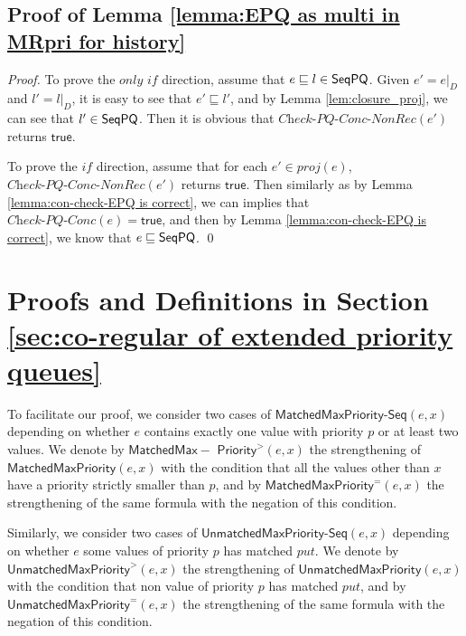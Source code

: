 \subsection{Proof of Lemma \ref{lemma:EPQ as multi in MRpri for history}}

\EPQasMultiInMRpriforHistory*

\begin {proof}

To prove the $\textit{only if}$ direction, assume that $e \sqsubseteq l \in \mathsf{SeqPQ}$. Given $e' = e \vert_{D}$ and $l' = l \vert_{D}$, it is easy to see that $e' \sqsubseteq l'$, and by Lemma \ref{lem:closure_proj}, we can see that $l' \in \mathsf{SeqPQ}$. Then it is obvious that $\textit{Check-PQ-Conc-NonRec}(e')$ returns $\mathsf{true}$.

To prove the $\textit{if}$ direction, assume that for each $e' \in \textit{proj}(e)$, $\textit{Check-PQ-Conc-NonRec}(e')$ returns $\mathsf{true}$. Then similarly as by Lemma \ref{lemma:con-check-EPQ is correct}, we can implies that $\textit{Check-PQ-Conc}(e)=\mathsf{true}$, and then by Lemma \ref{lemma:con-check-EPQ is correct}, we know that $e \sqsubseteq \mathsf{SeqPQ}$. \qed
\end {proof}







\section{Proofs and Definitions in Section \ref{sec:co-regular of extended priority queues}}
\label{sec:appendix proof and definition in section co-regular of extended priority queues}

To facilitate our proof, we consider two cases of $\mathsf{MatchedMaxPriority\text{-}Seq}(e,x)$ depending on whether $e$ contains exactly one value with priority $p$ or at least two values. We denote by $\mathsf{MatchedMax-}$ $\mathsf{Priority}^{>}(e,x)$ the strengthening of $\mathsf{MatchedMaxPriority}(e,x)$ with the condition that all the values other than $x$ have a priority strictly smaller than $p$, and by $\mathsf{MatchedMaxPriority}^{=}(e,x)$ the strengthening of the same formula with the negation of this condition.

Similarly, we consider two cases of $\mathsf{UnmatchedMaxPriority\text{-}Seq}(e,x)$ depending on whether $e$ some values of priority $p$ has matched $\textit{put}$. We denote by $\mathsf{UnmatchedMaxPriority}^{>}(e,x)$ the strengthening of $\mathsf{UnmatchedMaxPriority}(e,x)$ with the condition that non value of priority $p$ has matched $\textit{put}$, and by $\mathsf{UnmatchedMaxPriority}^{=}(e,x)$ the strengthening of the same formula with the negation of this condition.




